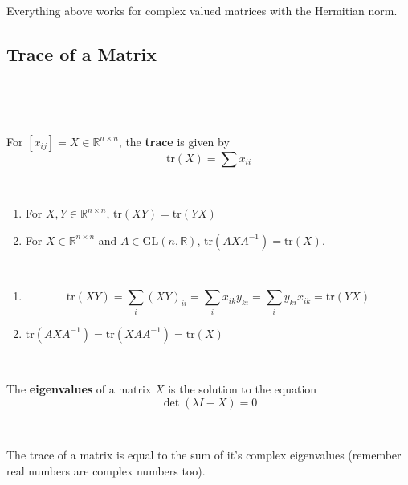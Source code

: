 \documentclass{article}
\begin{document}
\begin{remark}
  \

  Everything above works for complex valued matrices with the Hermitian norm.
\end{remark}

\subsection{Trace of a Matrix}
\

\begin{definition}[Trace]
  \

  For $[x_{ij}] = X \in \mathbb{R}^{n \times n}$, the \textbf{trace} is given by $$\text{tr}(X) = \sum x_{ii}$$
\end{definition}

\begin{proposition}
  \

  \begin{enumerate}

    \item For $X,Y \in \mathbb{R}^{n \times n}$, $\text{tr}(XY) = \text{tr}(YX)$
    \item For $X \in \mathbb{R}^{n \times n}$ and $A \in \text{GL}(n, \mathbb{R})$, $\text{tr}(AXA ^{-1}) = \text{tr}(X)$.
  \end{enumerate}
\end{proposition}

\begin{customproof}
  \

  \begin{enumerate}
    \item $$\text{tr}(XY) = \sum_i (XY)_{ii} = \sum_i x_{ik}y_{ki} = \sum_i y_{ki}x_{ik} = \text{tr}(YX)$$
    \item $\text{tr}(AXA ^{-1}) = \text{tr}(XAA ^{-1}) = \text{tr}(X)$
  \end{enumerate}
\end{customproof}

\begin{definition}[Eigenvalues]
  \

  The \textbf{eigenvalues} of a matrix $X$ is the solution to the equation $$\det(\lambda I - X) = 0$$
\end{definition}

\begin{proposition}
  \

  The trace of a matrix is equal to the sum of it's complex eigenvalues (remember real numbers are complex numbers too).
\end{proposition}
\end{document}
